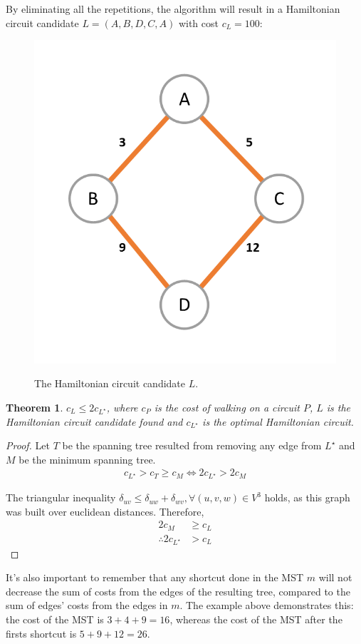 \documentclass[journal]{IEEEtran}
\newtheorem{theorem}{Theorem}[section]
\begin{document}
By eliminating all the repetitions, the algorithm will result in a Hamiltonian circuit candidate $L=(A, B, D, C, A)$ with cost $c_L = 100$:
\begin{figure}[H]
	\centering
	\includegraphics[width=.4\linewidth]{ex-ta-3}
	\label{fig:exta3}
	\caption{The Hamiltonian circuit candidate $L$.}
\end{figure}

\begin{theorem}
	$c_L \le 2 c_{L^\star}$, where $c_P$ is the cost of walking on a circuit $P$, $L$ is the Hamiltonian circuit candidate found and $c_{L^\star}$ is the optimal Hamiltonian circuit.
\end{theorem}
\begin{proof}
	Let $T$ be the spanning tree resulted from removing any edge from $L^\star$ and $M$ be the minimum spanning tree.
	\begin{align*}
	c_{L^\star}   > c_T \ge c_M \iff
	2c_{L^\star} > 2c_M
	\end{align*}
	
	The triangular inequality $\delta_{uv} \le \delta_{uw} + \delta_{wv}, \forall (u, v, w) \in V^3$ holds, as this graph was built over euclidean distances. Therefore,
	\begin{align*}
	2c_M &\ge c_L \\
	\therefore 2c_{L^\star} &> c_L
	\end{align*}
\end{proof}

It's also important to remember that any shortcut done in the MST $m$ will not decrease the sum of costs from the edges of the resulting tree, compared to the sum of edges' costs from the edges in $m$. The example above demonstrates this: the cost of the MST is $3+4+9=16$, whereas the cost of the MST after the firsts shortcut is $5+9+12=26$.
\end{document}
